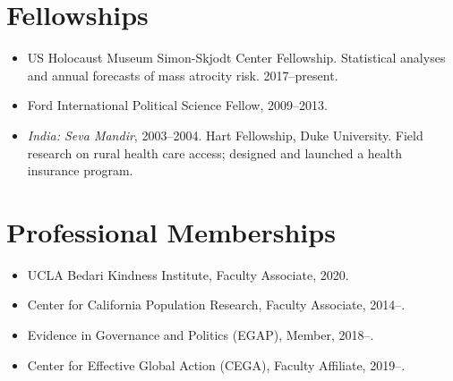 \documentclass[11pt]{article}
\begin{document}
\section{Fellowships}
\begin{itemize}
\item US Holocaust Museum Simon-Skjodt Center Fellowship. Statistical analyses and annual forecasts of mass atrocity risk. 2017--present.
\item Ford International Political Science Fellow, 2009--2013.
\item \emph{India: Seva Mandir}, 2003--2004. Hart Fellowship, Duke University. Field research on rural health care access; designed and launched a health insurance program.
\end{itemize}

\section{Professional Memberships}
\begin{itemize}
\item UCLA Bedari Kindness Institute, Faculty Associate, 2020.
\item Center for California Population Research, Faculty Associate, 2014--.
\item Evidence in Governance and Politics (EGAP), Member, 2018--.
\item Center for Effective Global Action (CEGA), Faculty Affiliate, 2019--.
\end{itemize}

\end{document}
